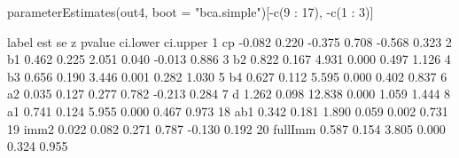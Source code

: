 \begin{Schunk}
\begin{Sinput}
 parameterEstimates(out4, 
                    boot = "bca.simple")[-c(9 : 17), -c(1 : 3)]
\end{Sinput}
\begin{Soutput}
     label    est    se      z pvalue ci.lower ci.upper
1       cp -0.082 0.220 -0.375  0.708   -0.568    0.323
2       b1  0.462 0.225  2.051  0.040   -0.013    0.886
3       b2  0.822 0.167  4.931  0.000    0.497    1.126
4       b3  0.656 0.190  3.446  0.001    0.282    1.030
5       b4  0.627 0.112  5.595  0.000    0.402    0.837
6       a2  0.035 0.127  0.277  0.782   -0.213    0.284
7        d  1.262 0.098 12.838  0.000    1.059    1.444
8       a1  0.741 0.124  5.955  0.000    0.467    0.973
18     ab1  0.342 0.181  1.890  0.059    0.002    0.731
19    imm2  0.022 0.082  0.271  0.787   -0.130    0.192
20 fullImm  0.587 0.154  3.805  0.000    0.324    0.955
\end{Soutput}
\end{Schunk}
